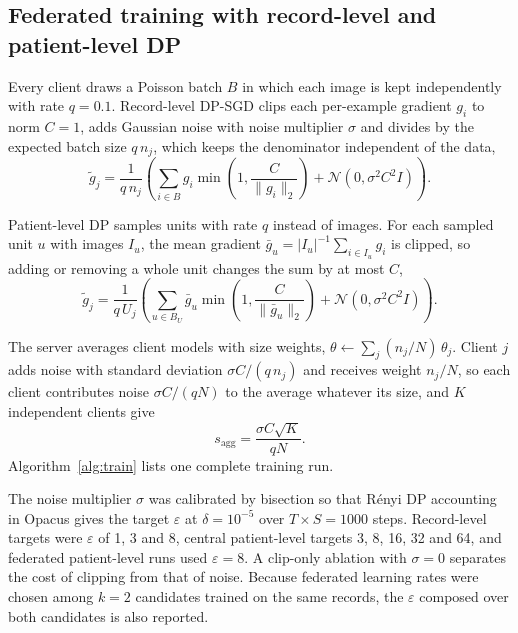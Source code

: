 \documentclass[preprint,12pt]{elsarticle}
\begin{document}
\subsection{Federated training with record-level and patient-level DP}
Every client draws a Poisson batch $B$ in which each image is kept independently with rate $q=0.1$. Record-level
DP-SGD\cite{abadi2016} clips each per-example gradient $g_i$ to norm $C=1$, adds Gaussian noise with noise multiplier
$\sigma$ and divides by the expected batch size $q\,n_j$, which keeps the denominator independent of the data,
\begin{equation}
\tilde{g}_j = \frac{1}{q\, n_j}\left( \sum_{i \in B} g_i \min\left(1, \frac{C}{\lVert g_i \rVert_2}\right)
+ \mathcal{N}\left(0, \sigma^2 C^2 I\right) \right).
\label{eq:dpsgd}
\end{equation}

Patient-level DP samples units with rate $q$ instead of images. For each sampled unit $u$ with images $I_u$, the mean
gradient $\bar{g}_u=|I_u|^{-1}\sum_{i\in I_u} g_i$ is clipped, so adding or removing a whole unit changes the sum by
at most $C$,
\begin{equation}
\tilde{g}_j = \frac{1}{q\, U_j}\left( \sum_{u \in B_U} \bar{g}_u \min\left(1, \frac{C}{\lVert \bar{g}_u \rVert_2}\right)
+ \mathcal{N}\left(0, \sigma^2 C^2 I\right) \right).
\label{eq:unitdp}
\end{equation}

The server averages client models with size weights, $\theta\gets\sum_j (n_j/N)\,\theta_j$. Client $j$ adds noise
with standard deviation $\sigma C/(q\,n_j)$ and receives weight $n_j/N$, so each client contributes noise
$\sigma C/(qN)$ to the average whatever its size, and $K$ independent clients give
\begin{equation}
s_{\mathrm{agg}} = \frac{\sigma C \sqrt{K}}{qN}.
\label{eq:aggnoise}
\end{equation}
Algorithm~\ref{alg:train} lists one complete training run.

The noise multiplier $\sigma$ was calibrated by bisection so that R\'enyi DP accounting\cite{mironov2017} in
Opacus\cite{yousefpour2021} gives the target $\varepsilon$ at $\delta=10^{-5}$ over $T\times S=1000$ steps.
Record-level targets were $\varepsilon$ of 1, 3 and 8, central patient-level targets 3, 8, 16, 32 and 64, and federated
patient-level runs used $\varepsilon=8$. A clip-only ablation with $\sigma=0$ separates the cost of clipping from that
of noise. Because federated learning rates were chosen among $k=2$ candidates trained on the same records, the
$\varepsilon$ composed over both candidates is also reported.\cite{papernot2022}
\end{document}
